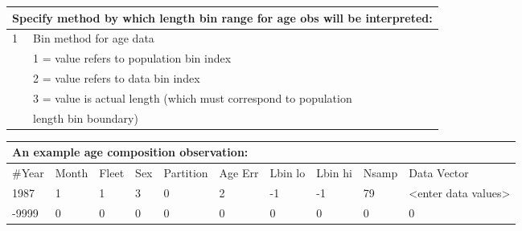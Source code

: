 		
		
\begin{center}
	\begin{tabular}{p{2cm} p{2cm} p{2cm} p{2cm} p{2cm} p{2cm} p{2cm}}
		\multicolumn{7}{l}{Specify method by which length bin range for age obs will be interpreted:}\\
		\hline
		1 & \multicolumn{6}{l}{Bin method for age data}\\
		  & \multicolumn{6}{l}{1 = value refers to population bin index}\\
		  & \multicolumn{6}{l}{2 = value refers to data bin index}\\
		  & \multicolumn{6}{l}{3 = value is actual length (which must correspond to population }\\
		  & \multicolumn{6}{l}{length bin boundary)}\\
	    \hline
	\end{tabular}
\end{center}

\begin{tabular}{p{1cm} p{1cm} p{1cm} p{1cm} p{1.5cm} p{1cm} p{1cm} p{1cm} p{1cm} p{2cm}}
		\multicolumn{10}{l}{An example age composition observation:}\\
		\hline
		\#Year & Month & Fleet & Sex & Partition & Age Err & Lbin lo & Lbin hi & Nsamp & Data Vector \\
		\hline
		1987 & 1 & 1 & 3 & 0 & 2 & -1 & -1 & 79 & <enter data values>\\
		-9999 & 0 & 0 & 0 & 0 & 0 & 0 & 0 & 0 & 0\\
		\hline
\end{tabular}


